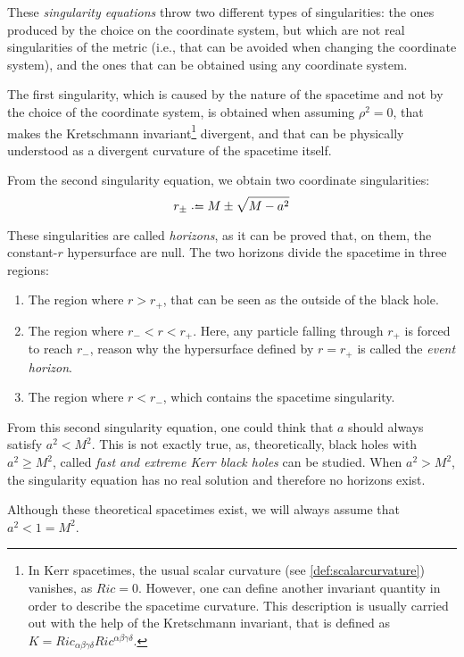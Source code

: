 These \emph{singularity equations} throw two different types of singularities: the ones produced by the choice on the coordinate system, but which are not real singularities of the metric (i.e., that can be avoided when changing the coordinate system), and the ones that can be obtained using any coordinate system.

The first singularity, which is caused by the nature of the spacetime and not by the choice of the coordinate system, is obtained when assuming $\rho^2 = 0$, that makes the Kretschmann invariant\footnote{In Kerr spacetimes, the usual scalar curvature (see \autoref{def:scalarcurvature}) vanishes, as $Ric = 0$. However, one can define another invariant quantity in order to describe the spacetime curvature. This description is usually carried out with the help of the Kretschmann invariant, that is defined as $K = Ric_{\alpha\beta\gamma\delta}Ric^{\alpha\beta\gamma\delta}$.} divergent, and that can be physically understood as a divergent curvature of the spacetime itself.

From the second singularity equation, we obtain two coordinate singularities:
\[
	r_{\pm} \defeq M \pm \sqrt{M - a^2}
\]

These singularities are called \emph{horizons}, as it can be proved \cite[p. 15]{galindo14} that, on them, the constant-$r$ hypersurface are null. The two horizons divide the spacetime in three regions:
\begin{enumerate}
	\item The region where $r > r_+$, that can be seen as the outside of the black hole.
	\item The region where $r_- < r < r_+$. Here, any particle falling through $r_+$ is forced to reach $r_-$, reason why the hypersurface defined by $r = r_+$ is called the \emph{event horizon}.
	\item The region where $r < r_-$, which contains the spacetime singularity.
\end{enumerate}

\begin{remark}
	From this second singularity equation, one could think that $a$ should always satisfy $a^2 < M^2$. This is not exactly true, as, theoretically, black holes with $a^2 \geq M^2$, called \emph{fast and extreme Kerr black holes} can be studied. When $a^2 > M^2$, the singularity equation has no real solution and therefore no horizons exist.
	
	Although these theoretical spacetimes exist, we will always assume that $a^2 < 1 = M^2$.
\end{remark}

